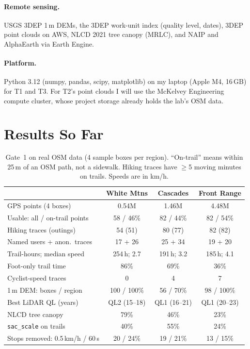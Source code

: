 \documentclass[10pt,twocolumn,letterpaper]{article}
\begin{document}
\paragraph{Remote sensing.} USGS 3DEP 1\,m DEMs, the 3DEP work-unit index (quality level, dates), 3DEP point clouds on AWS, NLCD 2021 tree canopy (MRLC), and NAIP and AlphaEarth via Earth Engine.

\paragraph{Platform.} Python 3.12 (numpy, pandas, scipy, matplotlib) on my laptop (Apple M4, 16\,GB) for T1 and T3. For T2's point clouds I will use the McKelvey Engineering compute cluster, whose project storage already holds the lab's OSM data.

\section{Results So Far}
\label{sec:results}

\begin{table}[t]
\centering
\footnotesize
\setlength{\tabcolsep}{2pt}
\begin{tabular}{@{}lccc@{}}
\toprule
 & White Mtns & Cascades & Front Range \\
\midrule
GPS points (4 boxes) & 0.54M & 1.46M & 4.48M \\
Usable: all / on-trail points & 58 / 46\% & 82 / 44\% & 82 / 54\% \\
Hiking traces (outings) & 54 (51) & 80 (77) & 82 (82) \\
Named users + anon.\ traces & 17 + 26 & 25 + 34 & 19 + 20 \\
Trail-hours; median speed & 254\,h; 2.7 & 191\,h; 3.2 & 185\,h; 4.1 \\
Foot-only trail time & 86\% & 69\% & 36\% \\
Cyclist-speed traces & 0 & 4 & 7 \\
1\,m DEM: boxes / region & 100 / 100\% & 56 / 70\% & 98 / 100\% \\
Best LiDAR QL (years) & QL2 (15--18) & QL1 (16--21) & QL1 (20--23) \\
NLCD tree canopy & 79\% & 46\% & 23\% \\
\texttt{sac\_scale} on trails & 40\% & 55\% & 24\% \\
Stops removed: 0.5\,km/h / 60\,s & 20 / 24\% & 19 / 21\% & 13 / 15\% \\
\bottomrule
\end{tabular}
\caption{Gate~1 on real OSM data (4 sample boxes per region). ``On-trail'' means within 25\,m of an OSM path, not a sidewalk. Hiking traces have $\geq$5 moving minutes on trails. Speeds are in km/h.}
\label{tab:gate1}
\end{table}
\end{document}
